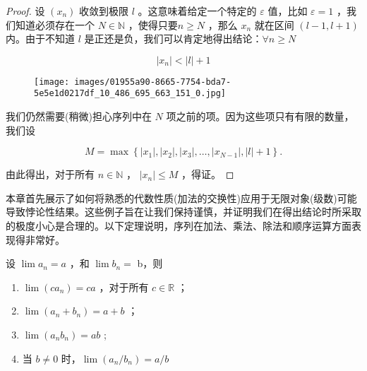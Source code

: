 \begin{proof}
设 \(\left( {x}_{n}\right)\) 收敛到极限 \(l\) 。这意味着给定一个特定的 \(\varepsilon\) 值，比如 \(\varepsilon  = 1\) ，我们知道必须存在一个 \(N \in  \mathbb{N}\) ，使得只要\(n \geq  N\) ，那么 \({x}_{n}\) 就在区间 \(\left( {l - 1,l + 1}\right)\) 内。由于不知道 \(l\) 是正还是负，我们可以肯定地得出结论：$\forall n\ge  N$

\[
\left| {x}_{n}\right|  < \left| l\right|  + 1
\]

\begin{figure}[h]
  \centering
  \texttt{[image: images/01955a90-8665-7754-bda7-5e5e1d0217df\_10\_486\_695\_663\_151\_0.jpg]}
\end{figure}

我们仍然需要(稍微)担心序列中在 \(N\) 项之前的项。因为这些项只有有限的数量，我们设

\[
M = \max \left\{  {\left| {x}_{1}\right| ,\left| {x}_{2}\right| ,\left| {x}_{3}\right| ,\ldots ,\left| {x}_{N - 1}\right| ,\left| l\right|  + 1}\right\}  .
\]

由此得出，对于所有 \(n \in  \mathbb{N}\) ， \(\left| {x}_{n}\right|  \leq  M\) ，得证。  
\end{proof}

本章首先展示了如何将熟悉的代数性质(加法的交换性)应用于无限对象(级数)可能导致悖论性结果。这些例子旨在让我们保持谨慎，并证明我们在得出结论时所采取的极度小心是合理的。以下定理说明，序列在加法、乘法、除法和顺序运算方面表现得非常好。

\begin{Thm}[代数极限定理]
  \label{thm:2.3.3}
  设 \(\lim {a}_{n} = a\) ，和 \(\lim {b}_{n} =\) b，则
  \begin{enumerate}[label = (\roman*)]
  \item\label{item:2.3.1}\(\lim \left( {c{a}_{n}}\right)  = {ca}\) ，对于所有 \(c \in  \mathbb{R}\) ；
  \item \label{item:2.3.2}\(\lim \left( {{a}_{n} + {b}_{n}}\right)  = a + b\) ；
  \item \label{item:2.3.3} \(\lim \left( {{a}_{n}{b}_{n}}\right)  = {ab}\) ;
  \item \label{item:2.3.4} 当 $b\ne 0$ 时，\(\lim \left( {{a}_{n}/{b}_{n}}\right)  = a/b\) 
  \end{enumerate}
\end{Thm}

